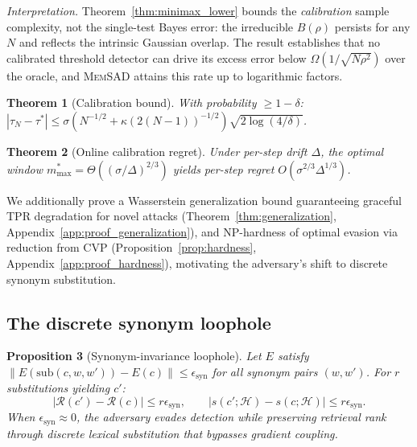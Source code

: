 \documentclass{article}
\newtheorem{theorem}{Theorem}
\newtheorem{proposition}[theorem]{Proposition}
\theoremstyle{definition}
\newcommand{\cH}{\mathcal{H}}
\newcommand{\cR}{\mathcal{R}}
\newcommand{\memsad}{\textnormal{\textsc{MemSAD}}}
\newcommand{\enc}{E}
\begin{document}
\noindent \emph{Interpretation.} Theorem~\ref{thm:minimax_lower} bounds the \emph{calibration} sample complexity, not the single-test Bayes error: the irreducible $B(\rho)$ persists for any $N$ and reflects the intrinsic Gaussian overlap. The result establishes that no calibrated threshold detector can drive its excess error below $\Omega(1/\sqrt{N \rho^2})$ over the oracle, and \memsad{} attains this rate up to logarithmic factors.

\begin{theorem}[Calibration bound]
\label{thm:calibration_bound}
With probability $\geq 1-\delta$: $|\tau_N - \tau^*| \leq \sigma(N^{-1/2} + \kappa(2(N{-}1))^{-1/2})\sqrt{2\log(4/\delta)}$.
\end{theorem}

\begin{theorem}[Online calibration regret]
\label{thm:regret}
Under per-step drift $\Delta$, the optimal window $m_{\max}^* = \Theta((\sigma/\Delta)^{2/3})$ yields per-step regret $O(\sigma^{2/3}\Delta^{1/3})$.
\end{theorem}

We additionally prove a Wasserstein generalization bound guaranteeing graceful TPR degradation for novel attacks (Theorem~\ref{thm:generalization}, Appendix~\ref{app:proof_generalization}), and NP-hardness of optimal evasion via reduction from CVP (Proposition~\ref{prop:hardness}, Appendix~\ref{app:proof_hardness}), motivating the adversary's shift to discrete synonym substitution.

\subsection{The discrete synonym loophole}

\begin{proposition}[Synonym-invariance loophole]
\label{prop:synonym}
Let $\enc$ satisfy $\|\enc(\mathrm{sub}(c, w, w')) - \enc(c)\| \leq \epsilon_{\text{syn}}$ for all synonym pairs $(w, w')$. For $r$ substitutions yielding $c'$:
\begin{equation}
  |\cR(c') - \cR(c)| \leq r \epsilon_{\text{syn}}, \qquad
  |s(c'; \cH) - s(c; \cH)| \leq r \epsilon_{\text{syn}}.
  \label{eq:synonym_bounds}
\end{equation}
When $\epsilon_{\text{syn}} \approx 0$, the adversary evades detection while preserving retrieval rank through discrete lexical substitution that bypasses gradient coupling.
\end{proposition}
\end{document}
